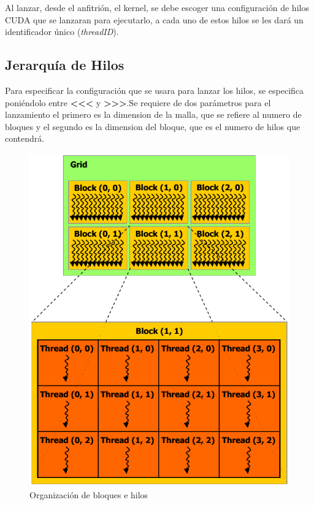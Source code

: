 Al lanzar, desde el anfitrión, el kernel, se debe escoger una configuración de hilos CUDA que se lanzaran para ejecutarlo, a cada uno de estos hilos se les dará un identificador único (\textit{threadID}). 

\subsection{Jerarquía de Hilos}

Para especificar la configuración que se usara para lanzar los hilos, se especifica poniéndolo entre \textbf{\textless\textless\textless} y \textbf{\textgreater\textgreater\textgreater}.Se requiere de dos parámetros para el lanzamiento el primero es la dimension de la malla, que se refiere al numero de bloques y el segundo es la dimension del bloque, que es el numero de hilos que contendrá. 


\begin{figure}[h]
			\centering
				\includegraphics[scale=0.45]{img/grid_block.png}
			\caption{Organización de bloques e hilos}
\end{figure}


